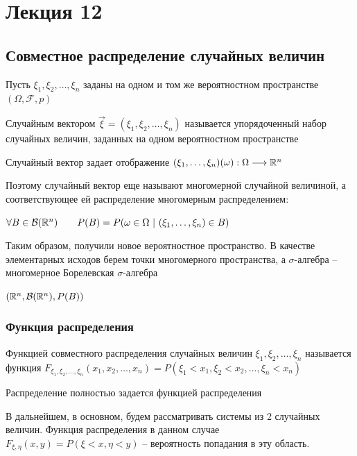 \documentclass[12pt]{article}
\begin{document}
    \section{Лекция 12}

    \hypertarget{jointdistribution}{}

    \subsection{Совместное распределение случайных величин}

    Пусть $\xi_1, \xi_2, \dots, \xi_n$ заданы на одном и том же вероятностном пространстве $(\Omega, \mathcal{F}, p)$

    \Def Случайным вектором $\vec{\xi} = (\xi_1, \xi_2, \dots, \xi_n)$ называется упорядоченный набор случайных величин, заданных
    на одном вероятностном пространстве

    Случайный вектор задает отображение $(\xi_1, \dots, \xi_n) (\omega) : \Omega \longrightarrow \mathbb{R}^n$

    Поэтому случайный вектор еще называют многомерной случайной величиной, 
    а соответствующее ей распределение многомерным распределением: 

    $\forall B \in \mathcal{B}(\mathbb{R}^n) \qquad P(B) = P(\omega \in \Omega \ | \ (\xi_1, \dots, \xi_n) \in B)$

    Таким образом, получили новое вероятностное пространство. В качестве элементарных исходов берем точки многомерного пространства, 
    а $\sigma$-алгебра -- многомерное Борелевская $\sigma$-алгебра

    $(\mathbb{R}^n, \mathcal{B}(\mathbb{R}^n), P(B))$

    \hypertarget{jointdistributionfunction}{}

    \subsubsection{Функция распределения}

    \Def Функцией совместного распределения случайных величин $\xi_1, \xi_2, \dots, \xi_n$ называется функция 
    $F_{\xi_1, \xi_2, \dots, \xi_n}(x_1, x_2, \dots, x_n) = P(\xi_1 < x_1, \xi_2 < x_2, \dots, \xi_n < x_n)$

    \Notas Распределение полностью задается функцией распределения

    \Nota В дальнейшем, в основном, будем рассматривать системы из 2 случайных величин. Функция распределения в данном случае $F_{\xi, \eta}(x, y) = P(\xi < x, \eta < y)$ -- вероятность попадания в эту область.
\end{document}
